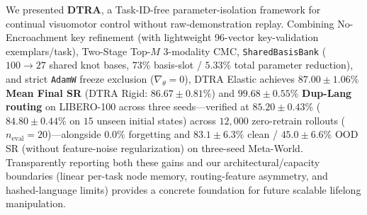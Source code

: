 \documentclass[10pt]{article}
\begin{document}
We presented \textbf{DTRA}, a Task-ID-free parameter-isolation framework for continual visuomotor control without raw-demonstration replay. Combining No-Encroachment key refinement (with lightweight 96-vector key-validation exemplars/task), Two-Stage Top-$M$ 3-modality CMC, \texttt{SharedBasisBank} ($100 \to 27$ shared knot bases, $73\%$ basis-slot / $5.33\%$ total parameter reduction), and strict \texttt{AdamW} freeze exclusion ($\nabla_\theta=0$), DTRA Elastic achieves $\mathbf{87.00 \pm 1.06}$\% \textbf{Mean Final SR} (DTRA Rigid: $86.67 \pm 0.81$\%) and $\mathbf{99.68 \pm 0.55}$\% \textbf{Dup-Lang routing} on LIBERO-100 across three seeds---verified at $\mathbf{85.20 \pm 0.43}\%$ ($84.80 \pm 0.44\%$ on $15$ unseen initial states) across $12{,}000$ zero-retrain rollouts ($n_{\text{eval}}=20$)---alongside $0.0\%$ forgetting and $83.1 \pm 6.3\%$ clean / $45.0 \pm 6.6\%$ OOD SR (without feature-noise regularization) on three-seed Meta-World. Transparently reporting both these gains and our architectural/capacity boundaries (linear per-task node memory, routing-feature asymmetry, and hashed-language limits) provides a concrete foundation for future scalable lifelong manipulation.

\clearpage
\end{document}
